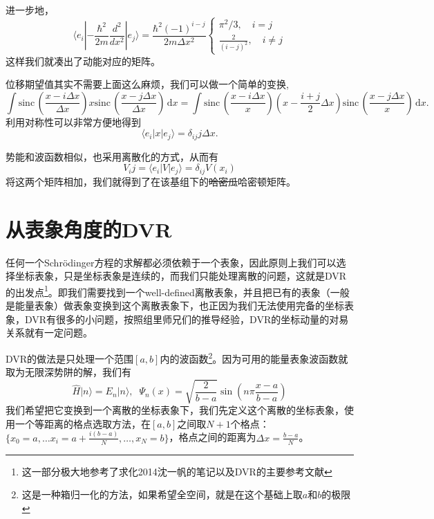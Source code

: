 \documentclass[12pt,a4paper,openany,twoside]{book}
\numberwithin{equation}{section}
\newcommand{\sinc}[1]{\mathrm{sinc} \, (#1)}
\newcommand{\sch}{Schr\"odinger}
\begin{document}
        进一步地，
        \begin{equation}
       	  \langle e_i | -\frac{\hbar ^2}{2m} \frac{d^2}{dx ^2} | e_j \rangle = \frac{\hbar^{2}(-1)^{i-j}}{2 m \Delta x^{2}} \begin{cases}{\pi^{2} / 3,} \quad {i=j} \\ {\frac{2}{\left(i-j\right)^{2}},} \quad {i \neq j}\end{cases}
        \end{equation}
        这样我们就凑出了动能对应的矩阵。

        位移期望值其实不需要上面这么麻烦，我们可以做一个简单的变换,
        \[
      	  \int \sinc{\frac{x- i \Delta x}{\Delta x}} x \sinc{\frac{x- j \Delta x}{\Delta x}}\, \mathrm{d} x = \int \sinc{\frac{x- i \Delta x}{x}} (x- \frac{i+j}{2}\Delta x) \sinc{\frac{x-j \Delta x}{x}}\, \mathrm{d}x
        .\] 
        利用对称性可以非常方便地得到
        \[
      	  \langle e_i | x | e_j \rangle = \delta_{ij} j \Delta x
        .\] 
       
        势能和波函数相似，也采用离散化的方式，从而有
        \begin{equation}
      	  V_ij = \langle e_i | V | e_j \rangle  = \delta_{ij} V(x_i)
        \end{equation}
        将这两个矩阵相加，我们就得到了在该基组下的\sout{哈密瓜}哈密顿矩阵。
        
      \section{从表象角度的DVR}
        任何一个\sch 方程的求解都必须依赖于一个表象，因此原则上我们可以选择坐标表象，只是坐标表象是连续的，而我们只能处理离散的问题，这就是DVR的出发点\footnote{这一部分极大地参考了求化2014沈一帆的笔记以及DVR的主要参考文献\cite{colbert1992novel}}。即我们需要找到一个well-defined离散表象，并且把已有的表象（一般是能量表象）做表象变换到这个离散表象下，也正因为我们无法使用完备的坐标表象，DVR有很多的小问题，按照组里师兄们的推导经验，DVR的坐标动量的对易关系就有一定问题。

        DVR的做法是只处理一个范围$[a,b]$内的波函数\footnote{这是一种箱归一化的方法，如果希望全空间，就是在这个基础上取$a$和$b$的极限}。因为可用的能量表象波函数就取为无限深势阱的解，我们有
        \begin{equation}
          \hat{H} | n \rangle = E_n | n \rangle,\;\; \Psi_n(x) = \sqrt{\frac{2}{b-a}}\sin\left(n\pi\frac{x-a}{b-a}\right)
        \end{equation}
        我们希望把它变换到一个离散的坐标表象下，我们先定义这个离散的坐标表象，使用一个等距离的格点选取方法，在$[a,b]$之间取$N+1$个格点：$\{x_0 = a,\dots x_i = a + \frac{i(b-a)}{N},\dots, x_N = b\}$，格点之间的距离为$\Delta x = \frac{b-a}{N}$。
        
\end{document}
